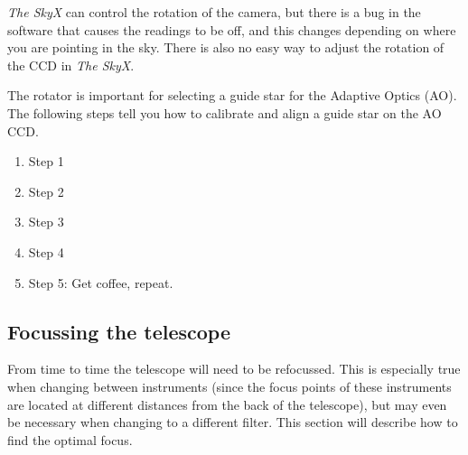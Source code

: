 \documentclass[12pt,twoside,a4paper]{report}
\begin{document}

\emph{The SkyX} can control the rotation of the camera, but there is a bug in the software that causes the readings to be off, and this changes depending on where you are pointing in the sky. There is also no easy way to adjust the rotation of the CCD in \emph{The SkyX}.\\

\clearpage

The rotator is important for selecting a guide star for the Adaptive Optics (AO). The following steps tell you how to calibrate and align a guide star on the AO CCD.
\begin{enumerate}
 \item Step 1
 \item Step 2
 \item Step 3
 \item Step 4
 \item Step 5: Get coffee, repeat.
\end{enumerate}


\subsection{Focussing the telescope}
\label{focussing}

From time to time the telescope will need to be refocussed. This is especially true when changing between instruments (since the focus points of these instruments are located at different distances from the back of the telescope), but may even be necessary when changing to a different filter. This section will describe how to find the optimal focus.
\end{document}
